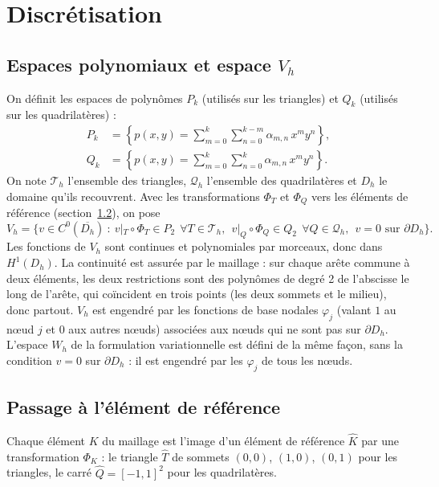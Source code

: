 \documentclass[11pt,a4paper]{article}
\begin{document}
\section{Discrétisation}

\subsection{Espaces polynomiaux et espace $V_h$}
\label{sec:Vh}

On définit les espaces de polynômes $P_k$ (utilisés sur les triangles) et
$Q_k$ (utilisés sur les quadrilatères) :
\begin{align*}
P_k &= \left\{ p(x,y) = \sum_{m=0}^{k} \sum_{n=0}^{k-m} \alpha_{m,n}\, x^m y^n \right\},\\[4pt]
Q_k &= \left\{ p(x,y) = \sum_{m=0}^{k} \sum_{n=0}^{k} \alpha_{m,n}\, x^m y^n \right\}.
\end{align*}
On note $\mathcal{T}_h$ l'ensemble des triangles, $\mathcal{Q}_h$
l'ensemble des quadrilatères et $D_h$ le domaine qu'ils recouvrent. Avec les
transformations $\Phi_T$ et $\Phi_Q$ vers les éléments de référence
(section~\ref{sec:ref}), on pose
\[
V_h = \Big\{ v \in C^0(\overline{D_h}) \ :\
v|_T \circ \Phi_T \in P_2 \ \ \forall T \in \mathcal{T}_h,\ \
v|_Q \circ \Phi_Q \in Q_2 \ \ \forall Q \in \mathcal{Q}_h,\ \
v = 0 \text{ sur } \partial D_h \Big\}.
\]
Les fonctions de $V_h$ sont continues et polynomiales par morceaux, donc
dans $H^1(D_h)$. La continuité est assurée par le maillage : sur chaque
arête commune à deux éléments, les deux restrictions sont des polynômes de
degré 2 de l'abscisse le long de l'arête, qui coïncident en trois points
(les deux sommets et le milieu), donc partout. $V_h$ est engendré par les
fonctions de base nodales $\varphi_j$ (valant $1$ au nœud $j$ et $0$ aux
autres nœuds) associées aux nœuds qui ne sont pas sur $\partial D_h$.
L'espace $W_h$ de la formulation variationnelle est défini de la même
façon, sans la condition $v = 0$ sur $\partial D_h$ : il est engendré par
les $\varphi_j$ de tous les nœuds.

\subsection{Passage à l'élément de référence}
\label{sec:ref}

Chaque élément $K$ du maillage est l'image d'un élément de référence
$\widehat{K}$ par une transformation $\Phi_K$ : le triangle $\widehat{T}$ de
sommets $(0,0)$, $(1,0)$, $(0,1)$ pour les triangles, le carré
$\widehat{Q} = [-1,1]^2$ pour les quadrilatères.
\end{document}
